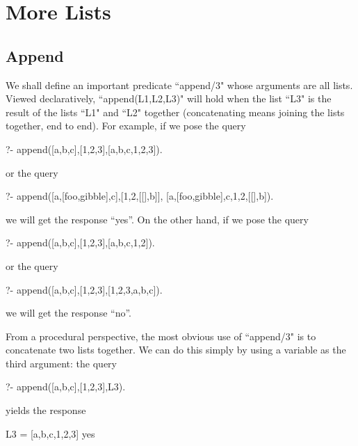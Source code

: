 

\chapter{More Lists}\label{CHAPTER6}


\section{Append}\label{SEC.L6.APPEND}



We shall define an important predicate ``append/3" whose arguments are
all lists.  Viewed declaratively, ``append(L1,L2,L3)" will
 hold when the list ``L3" is
the result of  the lists ``L1" and ``L2"
together (concatenating means joining the lists together, end to end).
For example, if we pose the query
\begin{LPNcodedisplay}
?- append([a,b,c],[1,2,3],[a,b,c,1,2,3]).
\end{LPNcodedisplay}
or the query
\begin{LPNcodedisplay}
?- append([a,[foo,gibble],c],[1,2,[[],b]],
          [a,[foo,gibble],c,1,2,[[],b]).
\end{LPNcodedisplay}
we will get the response ``yes''. On the other hand, if we pose
the query
\begin{LPNcodedisplay}
?- append([a,b,c],[1,2,3],[a,b,c,1,2]).
\end{LPNcodedisplay}
or the query
\begin{LPNcodedisplay}
?- append([a,b,c],[1,2,3],[1,2,3,a,b,c]).
\end{LPNcodedisplay}
we will get the response ``no''.


From a procedural perspective, the most obvious use of ``append/3"
is to concatenate two lists together. We can do this simply by using a
variable as the third argument: the query
\begin{LPNcodedisplay}
?- append([a,b,c],[1,2,3],L3).
\end{LPNcodedisplay}
yields the response
\begin{LPNcodedisplay}
L3 = [a,b,c,1,2,3]
yes
\end{LPNcodedisplay}

